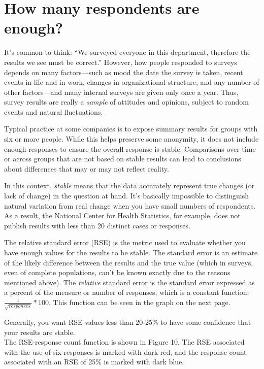\documentclass[]{book}
\begin{document}
\chapter{How many respondents are
enough?}\label{how-many-respondents-are-enough}

It's common to think: ``We surveyed everyone in this department,
therefore the results we see must be correct.'' However, how people
responded to surveys depends on many factors---such as mood the date the
survey is taken, recent events in life and in work, changes in
organizational structure, and any number of other factors---and many
internal surveys are given only once a year. Thus, survey results are
really a \emph{sample} of attitudes and opinions, subject to random
events and natural fluctuations.

Typical practice at some companies is to expose summary results for
groups with six or more people. While this helps preserve some
anonymity, it does not include enough responses to ensure the overall
response is stable. Comparisons over time or across groups that are not
based on stable results can lead to conclusions about differences that
may or may not reflect reality.

In this context, \emph{stable} means that the data accurately represent
true changes (or lack of change) in the question at hand. It's basically
impossible to distinguish natural variation from real change when you
have small numbers of respondents. As a result, the National Center for
Health Statistics, for example, does not publish results with less than
20 distinct cases or responses.

The relative standard error (RSE) is the metric used to evaluate whether
you have enough values for the results to be stable. The standard error
is an estimate of the likely difference between the results and the true
value (which in surveys, even of complete populations, can't be known
exactly due to the reasons mentioned above). The \emph{relative}
standard error is the standard error expressed as a percent of the
measure or number of responses, which is a constant function:
\(\frac{1}{\sqrt{responses}} * 100\). This function can be seen in the
graph on the next page.

Generally, you want RSE values less than 20-25\% to have some confidence
that your results are stable.\\
The RSE-response count function is shown in Figure 10. The RSE
associated with the use of six responses is marked with dark red, and
the response count associated with an RSE of 25\% is marked with dark
blue.
\end{document}
